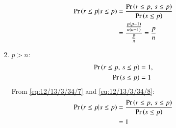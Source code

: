 \begin{enumerate}
\begin{enumerate}
\begin{align}
\Pr\left(r\le p|s\le p\right) &= \frac{\Pr\left(r \le p, \, s \le p\right)}{\Pr\left(s \le p\right)}\\
&= \frac{\frac{p(p-1)}{n(n-1)}}{\frac{p}{n}}
=\frac{p}{n}
\end{align}
\item $p>n$:
\begin{align}
\pr{r \le p, \, s \le p} &= 1 \label{eq:12/13/3/34/7},\\
\pr{s \le p} &= 1 \label{eq:12/13/3/34/8}
\end{align}
From \eqref{eq:12/13/3/34/7} and \eqref{eq:12/13/3/34/8}:
\begin{align}
\Pr\left(r\le p|s\le p\right) &= \frac{\Pr\left(r \le p, \, s \le p\right)}{\Pr\left(s \le p\right)}\\
&= 1 
\end{align}
\end{enumerate}
\end{enumerate}





















